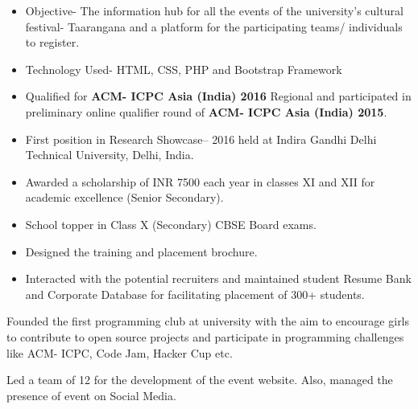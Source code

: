 \documentclass[9.5pt,a4paper]{altacv}
\begin{document}
\divider

\begin{itemize}
\item Objective- The information hub for all the events of the university's cultural festival- Taarangana and a platform for the participating teams/ individuals to register. 
\item Technology Used- HTML, CSS, PHP and Bootstrap Framework
\end{itemize}


\begin{itemize}
\item Qualified for \textbf{ACM- ICPC Asia (India) 2016} Regional and participated in preliminary online qualifier round of \textbf{ACM- ICPC Asia (India) 2015}.
\item First position in Research Showcase– 2016 held at Indira Gandhi Delhi Technical University, Delhi, India.  
\item Awarded a scholarship of INR 7500  each year in classes XI and XII for academic excellence (Senior Secondary).
\item School topper in Class X (Secondary) CBSE Board exams.
\end{itemize}


\begin{itemize}
\item Designed the training and placement brochure.
\item Interacted with the potential recruiters and maintained student Resume Bank and Corporate Database for facilitating placement of 300+ students.
\end{itemize}

Founded the first programming club at university with the aim to encourage girls to contribute to open source projects and participate in programming challenges like ACM- ICPC, Code Jam, Hacker Cup etc.

Led a team of 12 for the development of the event website. Also, managed the presence of event on Social Media.
\end{document}
